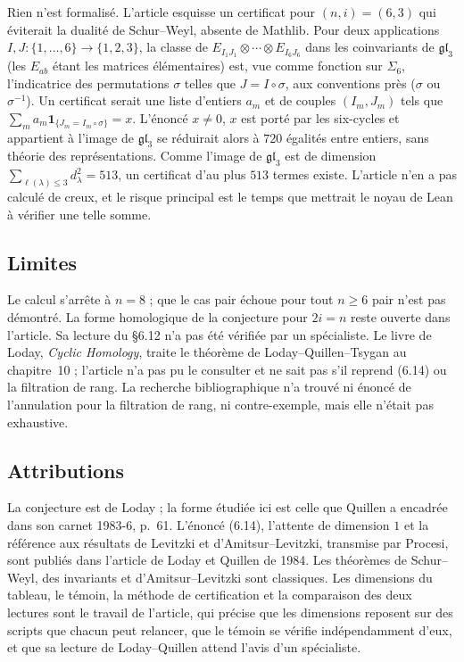 \documentclass[11pt,a4paper]{amsart}
\theoremstyle{definition}
\theoremstyle{plain}
\theoremstyle{remark}
\newcommand{\gl}{\mathfrak{gl}}
\begin{document}
Rien n'est formalisé. L'article esquisse un certificat pour $(n, i) = (6, 3)$ qui éviterait la dualité de Schur--Weyl, absente de Mathlib. Pour deux applications $I, J \colon \{1, \dots, 6\} \to \{1, 2, 3\}$, la classe de $E_{I_1J_1} \otimes \cdots \otimes E_{I_6J_6}$ dans les coinvariants de $\gl_3$ (les $E_{ab}$ étant les matrices élémentaires) est, vue comme fonction sur $\Sigma_6$, l'indicatrice des permutations $\sigma$ telles que $J = I \circ \sigma$, aux conventions près ($\sigma$ ou $\sigma^{-1}$). Un certificat serait une liste d'entiers $a_m$ et de couples $(I_m, J_m)$ tels que $\sum_m a_m \mathbf 1_{\{J_m = I_m \circ \sigma\}} = x$. L'énoncé \og $x \ne 0$, $x$ est porté par les six-cycles et appartient à l'image de $\gl_3$\fg{} se réduirait alors à $720$ égalités entre entiers, sans théorie des représentations. Comme l'image de $\gl_3$ est de dimension $\sum_{\ell(\lambda) \le 3} d_\lambda^2 = 513$, un certificat d'au plus $513$ termes existe. L'article n'en a pas calculé de creux, et le risque principal est le temps que mettrait le noyau de Lean à vérifier une telle somme.

\subsection{Limites}

Le calcul s'arrête à $n = 8$ ; que le cas pair échoue pour tout $n \ge 6$ pair n'est pas démontré. La forme homologique de la conjecture pour $2i = n$ reste ouverte dans l'article. Sa lecture du \S6.12 n'a pas été vérifiée par un spécialiste. Le livre de Loday, \emph{Cyclic Homology}, traite le théorème de Loday--Quillen--Tsygan au chapitre~10 ; l'article n'a pas pu le consulter et ne sait pas s'il reprend (6.14) ou la filtration de rang. La recherche bibliographique n'a trouvé ni énoncé de l'annulation pour la filtration de rang, ni contre-exemple, mais elle n'était pas exhaustive.

\subsection{Attributions}

La conjecture est de Loday ; la forme étudiée ici est celle que Quillen a encadrée dans son carnet 1983-6, p.~61. L'énoncé (6.14), l'attente de dimension $1$ et la référence aux résultats de Levitzki et d'Amitsur--Levitzki, transmise par Procesi, sont publiés dans l'article de Loday et Quillen de 1984. Les théorèmes de Schur--Weyl, des invariants et d'Amitsur--Levitzki sont classiques. Les dimensions du tableau, le témoin, la méthode de certification et la comparaison des deux lectures sont le travail de l'article, qui précise que les dimensions reposent sur des scripts que chacun peut relancer, que le témoin se vérifie indépendamment d'eux, et que sa lecture de Loday--Quillen attend l'avis d'un spécialiste.
\end{document}
